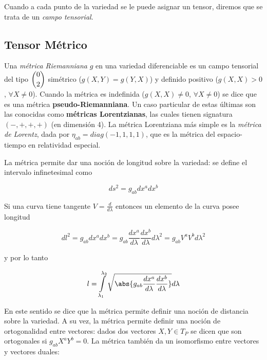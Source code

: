 Cuando a cada punto de la variedad se le puede asignar un tensor, diremos que se trata de un \textit{campo tensorial}. 
 

  



\subsection{Tensor Métrico} 

Una \textit{métrica Riemanniana} $g$ en una variedad diferenciable es un campo tensorial del tipo $\dbinom{0}{2}$ simétrico ($g(X,Y)=g(Y,X)$) y definido positivo ($g(X,X)>0$, $\forall X\neq 0$). Cuando la métrica es indefinida ($g(X,X)\neq 0$, $\forall X\neq 0$) se dice que es una métrica \textbf{pseudo-Riemanniana}.  Un caso particular de estas últimas son las conocidas como \textbf{métricas Lorentzianas}, las cuales tienen signatura $(-,+,+,+)$ (en dimensión 4). La métrica Lorentziana más simple es la \textit{métrica de Lorentz}, dada por $\eta_{ab}=diag(-1,1,1,1)$, que es la métrica del espacio-tiempo en relatividad especial.

La métrica permite dar una noción de longitud sobre la variedad: se define el intervalo infinetesimal como


\begin{equation*}
    ds^2=g_{ab}dx^adx^b
\end{equation*}
  
Si una curva tiene tangente $V=\frac{d}{d\lambda}$ entonces un elemento de la curva posee longitud

\begin{equation*}
    dl^2=g_{ab}dx^adx^b=g_{ab}\frac{dx^a}{d\lambda}\frac{dx^b}{d\lambda}d\lambda^2=g_{ab}V^aV^bd\lambda^2
\end{equation*}

y por lo tanto

\begin{equation*}
    l=\int\limits_{\lambda_1}^{\lambda_2}\sqrt{\abs{ g_{ab}\frac{dx^a}{d\lambda}\frac{dx^b}{d\lambda}}}d\lambda
\end{equation*}

En este sentido se dice que la métrica permite definir una noción de distancia sobre la variedad. A su vez, la métrica permite definir una noción de ortogonalidad entre vectores: dados dos vectores $X,Y\in T_P$ se dicen que son ortogonales si $g_{ab}X^aY^b=0$. La métrica también da un isomorfismo entre vectores y vectores duales:

